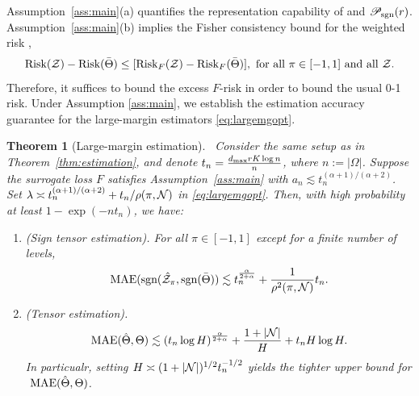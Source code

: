 \documentclass[11pt]{article}
\theoremstyle{plain}
\newtheorem{thm}{Theorem}[section]
\theoremstyle{definition}
\def\sign{\textup{sgn}}
\def\caliP{\mathscr{P}_{\textup{sgn}}}
\def\risk{\textup{Risk}}
\begin{document}
\noindent
Assumption~\ref{ass:main}(a) quantifies the representation capability of and $\caliP(r)$.  Assumption~\ref{ass:main}(b) implies the Fisher consistency bound for the weighted risk \citep{scott2011surrogate},
\begin{equation*} \label{eq:fisher}
\risk(\tZ)-\risk(\bar\Theta)\leq [\risk_{F}(\tZ)-\risk_{F}(\bar\Theta)], \text{ for all $\pi\in[-1,1]$ and all $\tZ$}.
\end{equation*}
Therefore, it suffices to bound the excess $F$-risk in order to bound the usual 0-1 risk. Under Assumption \ref{ass:main}, we establish the estimation accuracy guarantee for the large-margin estimators \eqref{eq:largemgopt}. 
\begin{thm}[Large-margin estimation]~\label{thm:extension} 
Consider the same setup as in Theorem~\ref{thm:estimation}, and denote $ t_n={d_{\max}rK\log n \over n}$, where $n:=|\Omega|$. Suppose the surrogate loss $F$ satisfies Assumption~\ref{ass:main} with $a_n \lesssim t_n^{(\alpha+1)/(\alpha+2)}$. Set $\lambda\asymp t_n^{(\alpha+1)/(\alpha+2)}+t_n/\rho(\pi,\mathcal{N})$ in \eqref{eq:largemgopt}. Then, with high probability at least $1-\exp(-nt_n)$,  we have:
\begin{enumerate}[label=(\alph*)]
\item (Sign tensor estimation). For all $\pi\in[-1,1]$ except for a finite number of levels,
\begin{equation}\label{eq:sfe}
\textup{MAE}(\sign(\hat \tZ_\pi,\sign(\bar\Theta)) \lesssim t_n ^{\alpha\over 2+\alpha}+{1\over \rho^2(\pi,\tN)}t_n.
\end{equation}

\item (Tensor estimation). 
\begin{equation}\label{eq:rfs}
\textup{MAE}(\hat\Theta,\Theta) \lesssim  \left(t_n\log H\right)^{\alpha \over 2+\alpha}+\frac{1+|\mathcal{N}|}{H}+t_nH\log H.
\end{equation}
In particualr, setting $H\asymp(1+|\mathcal{N}|)^{1/2} t_n^{-1/2}$ yields the tighter upper bound for$\textup{ MAE}(\hat\Theta,\Theta)$.
\end{enumerate}
\end{thm}
\end{document}

